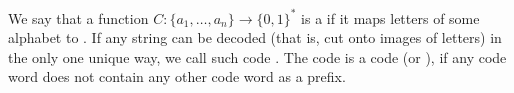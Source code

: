 We say that a function $C\colon \{a_1, \dots, a_n\} \to \{0, 1\}^*$ is a  if it maps
letters of some alphabet to . If any string can be decoded (that is, cut onto images
of letters) in the only one unique way, we call such code . The code is a
 code (or ), if any code word does not contain any other code word
as a prefix.
